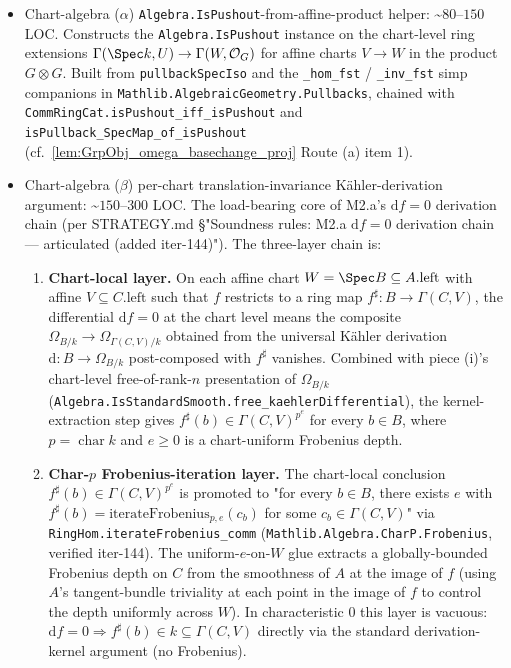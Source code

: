 \begin{itemize}
  \item Chart-algebra (\(\alpha\)) \texttt{Algebra.IsPushout}-from-affine-product helper: \textasciitilde\(80\)--\(150\) LOC. Constructs the \texttt{Algebra.IsPushout} instance on the chart-level ring extensions \(\Gamma(\Spec k, U) \to \Gamma(W, \mathcal O_G)\) for affine charts \(V \to W\) in the product \(G \otimes G\). Built from \texttt{pullbackSpecIso} and the \texttt{\_hom\_fst} / \texttt{\_inv\_fst} simp companions in \texttt{Mathlib.AlgebraicGeometry.Pullbacks}, chained with \texttt{CommRingCat.isPushout\_iff\_isPushout} and \texttt{isPullback\_SpecMap\_of\_isPushout} (cf.\ \cref{lem:GrpObj_omega_basechange_proj} Route (a) item 1).
  \item Chart-algebra (\(\beta\)) per-chart translation-invariance Kähler-derivation argument: \textasciitilde\(150\)--\(300\) LOC. The load-bearing core of M2.a's \(\mathrm df = 0\) derivation chain (per STRATEGY.md \S "Soundness rules: M2.a \(\mathrm df = 0\) derivation chain --- articulated (added iter-144)"). The three-layer chain is:
    \begin{enumerate}
      \item \textbf{Chart-local layer.} On each affine chart \(W = \Spec B \subseteq A.\mathrm{left}\) with affine \(V \subseteq C.\mathrm{left}\) such that \(f\) restricts to a ring map \(f^{\sharp} \colon B \to \Gamma(C, V)\), the differential \(\mathrm df = 0\) at the chart level means the composite \(\Omega_{B/k} \to \Omega_{\Gamma(C, V)/k}\) obtained from the universal Kähler derivation \(\mathrm d \colon B \to \Omega_{B/k}\) post-composed with \(f^{\sharp}\) vanishes. Combined with piece (i)'s chart-level free-of-rank-\(n\) presentation of \(\Omega_{B/k}\) (\texttt{Algebra.IsStandardSmooth.free\_kaehlerDifferential}), the kernel-extraction step gives \(f^{\sharp}(b) \in \Gamma(C, V)^{p^{e}}\) for every \(b \in B\), where \(p = \operatorname{char} k\) and \(e \geq 0\) is a chart-uniform Frobenius depth.
      \item \textbf{Char-\(p\) Frobenius-iteration layer.} The chart-local conclusion \(f^{\sharp}(b) \in \Gamma(C, V)^{p^{e}}\) is promoted to "for every \(b \in B\), there exists \(e\) with \(f^{\sharp}(b) = \mathrm{iterateFrobenius}_{p, e}(c_{b})\) for some \(c_{b} \in \Gamma(C, V)\)" via \texttt{RingHom.iterateFrobenius\_comm} (\texttt{Mathlib.Algebra.CharP.Frobenius}, verified iter-144). The uniform-\(e\)-on-\(W\) glue extracts a globally-bounded Frobenius depth on \(C\) from the smoothness of \(A\) at the image of \(f\) (using \(A\)'s tangent-bundle triviality at each point in the image of \(f\) to control the depth uniformly across \(W\)). In characteristic \(0\) this layer is vacuous: \(\mathrm df = 0 \Rightarrow f^{\sharp}(b) \in k \subseteq \Gamma(C, V)\) directly via the standard derivation-kernel argument (no Frobenius).

\end{enumerate}
\end{itemize}
